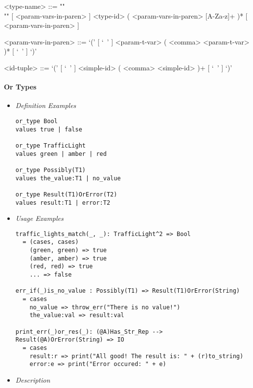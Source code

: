 \documentclass{article}
\begin{document}
\begin{itemize}
\begin{grammar}
<type-name> ::= ""\\""
[ <param-vars-in-paren> ] <type-id> ( <param-vars-in-paren> [A-Za-z]+ )*
[ <param-vars-in-paren> ]

<param-vars-in-paren> ::=
`(' [ `\ ' ] <param-t-var> ( <comma> <param-t-var> )* [ `\ ' ] `)'

<id-tuple> ::= `(' [ `\ ' ] <simple-id> ( <comma> <simple-id> )+ [ `\ ' ] `)'
\end{grammar}

\end{itemize}

\paragraph{Or Types}

\begin{itemize}
\item \textit{Definition Examples}

\begin{verbatim}
or_type Bool
values true | false

or_type TrafficLight
values green | amber | red

or_type Possibly(T1)
values the_value:T1 | no_value

or_type Result(T1)OrError(T2)
values result:T1 | error:T2
\end{verbatim}

\item \textit{Usage Examples}

\begin{verbatim}
traffic_lights_match(_, _): TrafficLight^2 => Bool
  = (cases, cases)
    (green, green) => true
    (amber, amber) => true
    (red, red) => true
    ... => false

err_if(_)is_no_value : Possibly(T1) => Result(T1)OrError(String)
  = cases
    no_value => throw_err("There is no value!")
    the_value:val => result:val

print_err(_)or_res(_): (@A)Has_Str_Rep --> Result(@A)OrError(String) => IO
  = cases
    result:r => print("All good! The result is: " + (r)to_string)
    error:e => print("Error occured: " + e)
\end{verbatim}

\newpage
\item \textit{Description}


\end{itemize}
\end{document}
